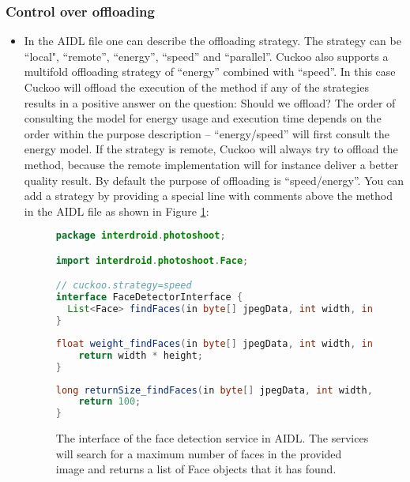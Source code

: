 \documentclass{article}
\begin{document}
\subsubsection{Control over offloading}
\begin{itemize}
  \item In the AIDL file one can describe the offloading strategy.  The strategy can be
``local", ``remote'', ``energy'', ``speed'' and ``parallel''. Cuckoo also
supports a multifold offloading strategy of ``energy'' combined with ``speed''.
In this case Cuckoo will offload the execution of the method if any of the
strategies results in a positive answer on the question:
Should we offload? The order of consulting the model for energy usage and
execution time depends on the order within the purpose description --
``energy/speed'' will first consult the energy model. If the strategy is remote,
Cuckoo will always try to offload the method, because the remote implementation
will for instance deliver a better quality result. By default the purpose of
offloading is ``speed/energy''. You can add a strategy by providing a special
line with comments above the method in the AIDL file as shown in Figure
\ref{figure-aidl}:

\begin{figure}[bt!] 
\centering
\begin{lstlisting}[language=java]
package interdroid.photoshoot;

import interdroid.photoshoot.Face;

// cuckoo.strategy=speed
interface FaceDetectorInterface {
  List<Face> findFaces(in byte[] jpegData, int width, int height, int maxFaces);
}
\end{lstlisting}

\begin{lstlisting}[language=java]
float weight_findFaces(in byte[] jpegData, int width, int height, int maxFaces) {
    return width * height;
}
\end{lstlisting}

\begin{lstlisting}[language=java]
long returnSize_findFaces(in byte[] jpegData, int width, int height, int maxFaces) {
    return 100;
}
\end{lstlisting}
\caption{The interface of the face detection service in AIDL. The services will
search for a maximum number of faces in the provided image and returns a list
of Face objects that it has found. }
\label{figure-aidl} 
\end{figure}


\end{itemize}
\end{document}
